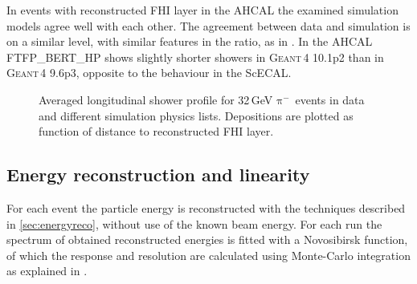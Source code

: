 \documentclass[twoside,a4paper,12pt]{article}
\newcommand\piminus{\(\mathrm{\pi^-}\)}
\newcommand\geant{\textsc{Geant\,4}\xspace}
\begin{document}
In events with reconstructed FHI layer in the AHCAL the examined simulation models agree well with each other. The agreement between data and simulation is on a similar level, with similar features in the ratio, as in \cite{CAN48}. In the AHCAL FTFP\_BERT\_HP shows slightly shorter showers in \geant 10.1p2 than in \geant 9.6p3, opposite to the behaviour in the ScECAL.

\begin{figure}[htbp]
\begin{center}
	\hfill
\end{center}
	\caption{Averaged longitudinal shower profile for 32\,GeV \piminus\ events in data and different simulation physics lists. Depositions are plotted as function of distance to reconstructed FHI layer.}
	\label{fig:profile_long_fhi}
\end{figure}

\subsection{Energy reconstruction and linearity}
For each event the particle energy is reconstructed with the techniques described in \autoref{sec:energyreco}, without use of the known beam energy. For each run the spectrum of obtained reconstructed energies is fitted with a Novosibirsk function, of which the response and resolution are calculated using Monte-Carlo integration as explained in \cite{CAN49}.
\end{document}
